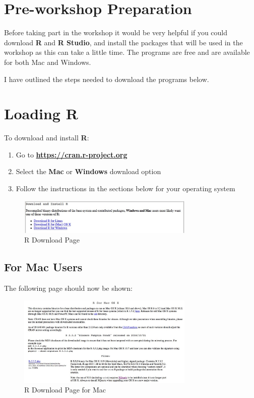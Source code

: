 \documentclass[12pt]{article}
\begin{document}
\sffamily
\setlength{\parindent}{0pt}
\setlength{\parskip}{1em}

\section*{Pre-workshop Preparation}
Before taking part in the workshop it would be very helpful if you could download \textbf{R} and \textbf{R Studio}, and install the packages that will be used in the workshop as this can take a little time. The programs are free and are available for both Mac and Windows. 

I have outlined the steps needed to download the programs below.

\section{Loading R}
To download and install \textbf{R}: 

\begin{enumerate}
	\item Go to \textbf{\url{https://cran.r-project.org}} 
	\item Select the \textbf{Mac} or \textbf{Windows} download option 
	\item Follow the instructions in the sections below for your operating system
\end{enumerate}

\begin{figure}[h]
	\centering
	\includegraphics[width=0.75\textwidth]{downloadR.jpg}
	\caption{R Download Page}
\end{figure}

\subsection*{For Mac Users}
The following page should now be shown:

\begin{figure}[H]
	\centering
	\includegraphics[width=0.75\textwidth]{macR.jpg}
	\caption{R Download Page for Mac}
\end{figure}
\end{document}

